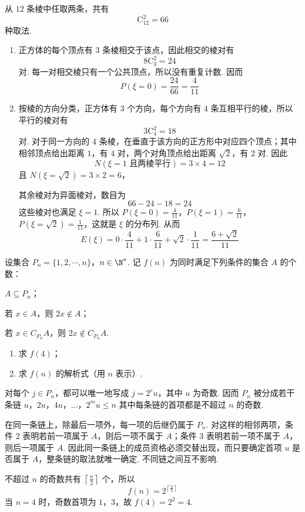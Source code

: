 \begin{solution}
从 \(12\) 条棱中任取两条，共有
\[
\mathrm C_{12}^{2}=66
\]
种取法.

\begin{enumerate}
\item 正方体的每个顶点有 \(3\) 条棱相交于该点，因此相交的棱对有
\[
8\mathrm C_{3}^{2}=24
\]
对. 每一对相交棱只有一个公共顶点，所以没有重复计数. 因而
\[
P(\xi=0)=\frac{24}{66}=\frac{4}{11}
\]

\item 按棱的方向分类，正方体有 \(3\) 个方向，每个方向有 \(4\) 条互相平行的棱，所以平行的棱对有
\[
3\mathrm C_{4}^{2}=18
\]
对. 对于同一方向的 \(4\) 条棱，在垂直于该方向的正方形中对应四个顶点；其中相邻顶点给出距离 \(1\)，有 \(4\) 对，两个对角顶点给出距离 \(\sqrt{2}\)，有 \(2\) 对. 因此
\[
N(\xi=1\text{ 且两棱平行})=3\times4=12
\]
且 \(N(\xi=\sqrt{2})=3\times2=6\)，

其余棱对为异面棱对，数目为
\[
66-24-18=24
\]
这些棱对也满足 \(\xi=1\). 所以 \(P(\xi=0)=\frac{4}{11}\)，\(P(\xi=1)=\frac{6}{11}\)，\(P(\xi=\sqrt{2})=\frac{1}{11}\)，这就是 \(\xi\) 的分布列.
从而
\[
E(\xi)=0\cdot\frac{4}{11}+1\cdot\frac{6}{11}+\sqrt{2}\cdot\frac{1}{11}=\frac{6+\sqrt{2}}{11}
\]
\end{enumerate}
\end{solution}

\begin{problem}
设集合 \(P_n = \{1,2,\cdots,n\}\)，\(n \in \N^*\). 记 \(f(n)\) 为同时满足下列条件的集合 \(A\) 的个数：
\begin{circlelist}
\item \(A \subseteq P_n\)；
\item 若 \(x \in A\)，则 \(2x \notin A\)；
\item 若 \(x \in C_{P_n}A\)，则 \(2x \notin C_{P_n}A\).
\end{circlelist}

\begin{enumerate}
\item 求 \(f(4)\)；
\item 求 \(f(n)\) 的解析式（用 \(n\) 表示）.
\end{enumerate}
\end{problem}

\begin{solution}
对每个 \(j\in P_n\)，都可以唯一地写成 \(j=2^r u\)，其中 \(u\) 为奇数. 因而 \(P_n\) 被分成若干条链
\(u\)，\(2u\)，\(4u\)，\(\ldots\)，\(2^m u\leqslant n\)
其中每条链的首项都是不超过 \(n\) 的奇数.

在同一条链上，除最后一项外，每一项的后继仍属于 \(P_n\). 对这样的相邻两项，条件 2 表明若前一项属于 \(A\)，则后一项不属于 \(A\)；条件 3 表明若前一项不属于 \(A\)，则后一项属于 \(A\). 因此同一条链上的成员资格必须交替出现，而只要确定首项 \(u\) 是否属于 \(A\)，整条链的取法就唯一确定. 不同链之间互不影响.

不超过 \(n\) 的奇数共有 \(\left\lceil\frac{n}{2}\right\rceil\) 个，所以
\[
f(n)=2^{\left\lceil\frac{n}{2}\right\rceil}
\]
当 \(n=4\) 时，奇数首项为 \(1\)，\(3\)，故 \(f(4)=2^2=4\).
\end{solution}
